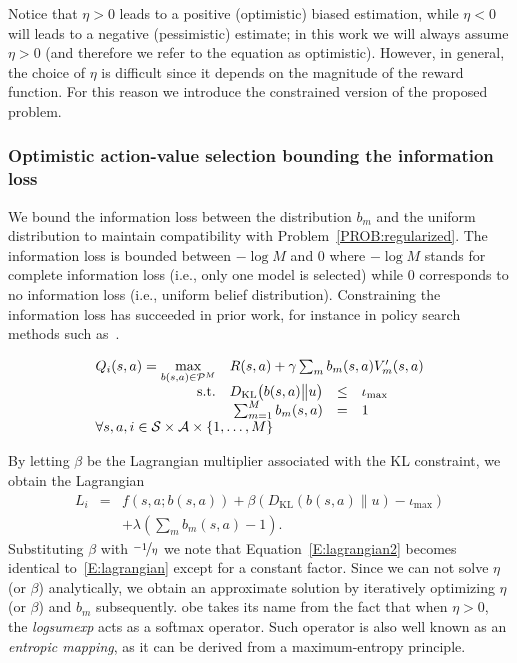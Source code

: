 Notice that $\eta>0$ leads to a positive (optimistic) biased estimation, while $\eta<0$ will leads to a negative (pessimistic) estimate; in this work we will always assume $\eta>0$ (and therefore we refer to the equation as optimistic). 
However, in general, the choice of $\eta$ is difficult since it depends on the magnitude of the reward function. For this reason we introduce the constrained version of the proposed problem.
 
\subsubsection{Optimistic action-value selection bounding the information loss}
We bound the information loss between the distribution $b_m$ and the uniform distribution to maintain compatibility with Problem~\ref{PROB:regularized}. The information loss is bounded between $-\log M$ and $0$ where  $-\log M$ stands for complete information loss (i.e., only one model is selected) while $0$ corresponds to no information loss (i.e., uniform belief distribution). Constraining the information loss has succeeded in prior work, for instance in policy search methods such as~\cite{peters2010relative}.
\begin{probdef}
\begin{equation}
\begin{array}{rrclcl}
\displaystyle Q_i(s,a) = \max_{b(s,a) \in \mathcal{P}^M} & \multicolumn{3}{l}{R(s,a) + \gamma \sum_m{b}_m(s,a)V_m'(s,a)\nonumber } \\
\text{s.t.} & D_{\mathrm{KL}}\big(b(s,a)\big{\|} u \big)& \leq & \iota_{\max} \\
& \sum_{m=1}^{M} b_m(s,a) & = & 1 \\
\multicolumn{4}{l}{ \forall s,a,i \in \mathcal{S} \times \mathcal{A} \times \{1,\dots,M\}}
\end{array} \nonumber
\end{equation}\label{PROB:constrversion}
\end{probdef}
\noindent By letting $\beta$ be the Lagrangian multiplier associated with the KL constraint, we obtain the Lagrangian
\begin{eqnarray}
L_i &\! = \!& f(s,a;b(s,a)) + \beta (D_{\mathrm{KL}}(b(s,a){\|}u) - \iota_{\max}) \nonumber \\
& &   + \lambda(\sum_m b_m(s,a) - 1).\label{E:lagrangian2}
\end{eqnarray}
Substituting $\beta$ with $\nicefrac{-1}{\eta}$ we note that Equation~\ref{E:lagrangian2} becomes identical to~\ref{E:lagrangian} except for a constant factor. Since we can not solve $\eta$ (or $\beta$) analytically, we obtain an approximate solution by iteratively optimizing $\eta$ (or $\beta$) and $b_m$ subsequently.
\gls{obe} takes its name from the fact that when $\eta > 0$, the \textit{logsumexp} acts as a softmax operator. Such operator is also well known as an \textit{entropic mapping}, as it can be derived from a maximum-entropy principle.

